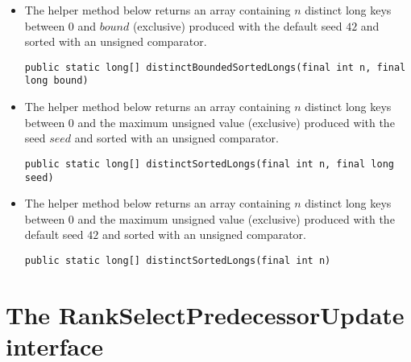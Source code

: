 \begin{itemize}
    \item
    The helper method below returns an array containing $n$ distinct {\ttfamily long} keys between 0 and $bound$ (exclusive) produced with the default seed $42$ and sorted with an unsigned comparator.
    \begin{lstlisting}
public static long[] distinctBoundedSortedLongs(final int n, final long bound)
    \end{lstlisting}
    
    \item
    The helper method below returns an array containing $n$ distinct {\ttfamily long} keys between 0 and the maximum unsigned value (exclusive) produced with the seed $seed$ and sorted with an unsigned comparator.
    \begin{lstlisting}
public static long[] distinctSortedLongs(final int n, final long seed)
    \end{lstlisting}
    
    \item
    The helper method below returns an array containing $n$ distinct {\ttfamily long} keys between 0 and the maximum unsigned value (exclusive) produced with the default seed $42$ and sorted with an unsigned comparator.
    \begin{lstlisting}
public static long[] distinctSortedLongs(final int n)
    \end{lstlisting}
\end{itemize}

\newpage
\section{The {\ttfamily RankSelectPredecessorUpdate} interface}

